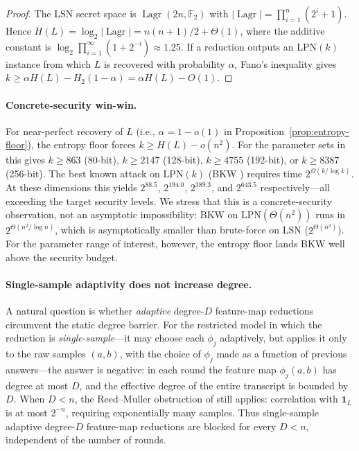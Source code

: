 \documentclass[11pt,a4paper]{article}
\theoremstyle{plain}
\theoremstyle{definition}
\newcommand{\F}{\mathbb{F}}
\DeclareMathOperator{\Lagr}{Lagr}
\begin{document}
\begin{proof}
The LSN secret space is $\Lagr(2n,\F_2)$ with $|\Lagr| = \prod_{i=1}^n (2^i+1)$. Hence $H(L) = \log_2|\Lagr| = n(n+1)/2 + \Theta(1)$, where the additive constant is $\log_2\prod_{i=1}^{\infty}(1+2^{-i}) \approx 1.25$. If a reduction outputs an $\mathrm{LPN}(k)$ instance from which $L$ is recovered with probability $\alpha$, Fano's inequality gives $k \geq \alpha H(L) - H_2(1-\alpha) = \alpha H(L) - O(1)$.
\end{proof}

\paragraph{Concrete-security win-win.} For near-perfect recovery of $L$ (i.e., $\alpha=1-o(1)$ in Proposition~\ref{prop:entropy-floor}), the entropy floor forces $k \geq H(L)-o(n^2)$. For the parameter sets in  this gives $k \geq 863$ (80-bit), $k \geq 2147$ (128-bit), $k \geq 4755$ (192-bit), or $k \geq 8387$ (256-bit). The best known attack on $\mathrm{LPN}(k)$ (BKW \cite{BKW03}) requires time $2^{\Omega(k/\log k)}$. At these dimensions this yields $2^{88.5}$, $2^{194.0}$, $2^{389.3}$, and $2^{643.5}$ respectively---all exceeding the target security levels. We stress that this is a concrete-security observation, not an asymptotic impossibility: BKW on $\mathrm{LPN}(\Theta(n^2))$ runs in $2^{\Theta(n^2/\log n)}$, which is asymptotically smaller than brute-force on LSN ($2^{\Theta(n^2)}$). For the parameter range of interest, however, the entropy floor lands BKW well above the security budget.

\paragraph{Single-sample adaptivity does not increase degree.} A natural question is whether \emph{adaptive} degree-$D$ feature-map reductions circumvent the static degree barrier. For the restricted model in which the reduction is \emph{single-sample}---it may choose each $\phi_j$ adaptively, but applies it only to the raw samples $(a,b)$, with the choice of $\phi_j$ made as a function of previous answers---the answer is negative: in each round the feature map $\phi_j(a,b)$ has degree at most $D$, and the effective degree of the entire transcript is bounded by $D$. When $D < n$, the Reed--Muller obstruction of  still applies: correlation with $\mathbf{1}_L$ is at most $2^{-n}$, requiring exponentially many samples. Thus single-sample adaptive degree-$D$ feature-map reductions are blocked for every $D < n$, independent of the number of rounds.
\end{document}
